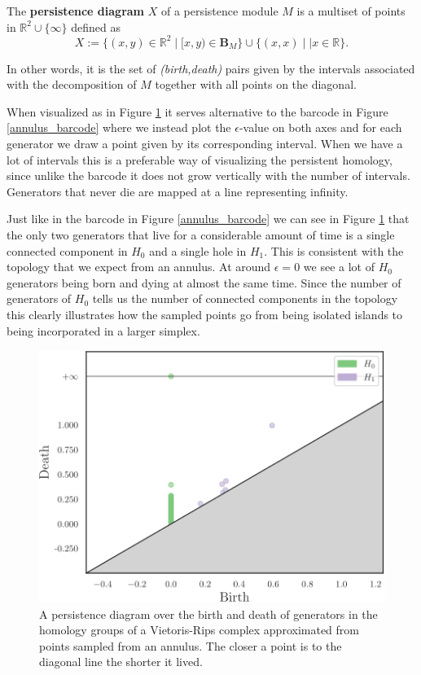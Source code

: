   \begin{definition}
    The \textbf{persistence diagram} $X$ of a persistence module $M$ is a multiset of points in $\mathbb{R}^{2}\cup \{\infty\}$ defined as
    \[
      X:=\{ (x,y) \in \mathbb{R}^{2} \mid [x,y) \in \mathbf{B}_{M}\} \cup \{ (x,x) \mid | x \in \mathbb{R}\}.
    \]
  \end{definition}
In other words, it is the set of \textit{(birth,death)} pairs given by the intervals associated with the decomposition of $M$ together with all points on the diagonal.

When visualized as in Figure \ref{pdiagram} it serves alternative to the barcode in Figure \ref{annulus_barcode} where we instead plot the $\epsilon$-value on both axes and for each generator we draw a point given by its corresponding interval. When we have a lot of intervals this is a preferable way of visualizing the persistent homology, since unlike the barcode it does not grow vertically with the number of intervals. Generators that never die are mapped at a line representing infinity.

Just like in the barcode in Figure \ref{annulus_barcode} we can see in Figure \ref{pdiagram} that the only two generators that live for a considerable amount of time is a single connected component in $H_{0}$ and a single hole in $H_{1}$. This is consistent with the topology that we expect from an annulus. At around $\epsilon=0$ we see a lot of $H_{0}$ generators being born and dying at almost the same time. Since the number of generators of $H_{0}$ tells us the number of connected components in the topology this clearly illustrates how the sampled points go from being isolated islands to being incorporated in a larger simplex.
\begin{figure}[ht]
  \centering
  \includegraphics[scale=0.7]{diagram.pdf}
  \caption{\label{pdiagram} A persistence diagram over the birth and death of generators in the homology groups of a Vietoris-Rips complex approximated from points sampled from an annulus. The closer a point is to the diagonal line the shorter it lived. }
\end{figure}

